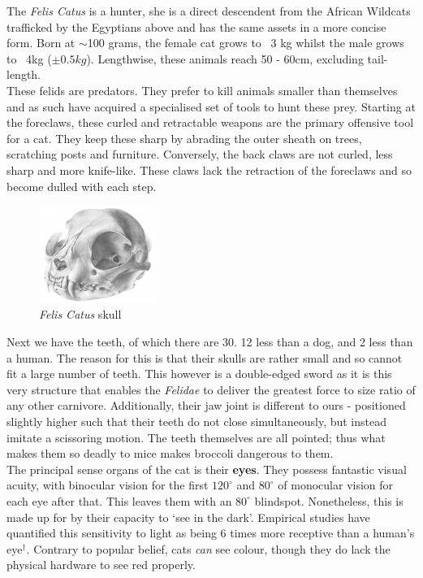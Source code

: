 \documentclass{article}
\begin{document}
\noindent{}The \emph{Felis Catus} is a hunter, she is a direct descendent from the African Wildcats trafficked by the Egyptians above and has the same assets in a more concise form. Born at $\sim$100 grams, the female cat grows to ~3 kg whilst the male grows to ~4kg (\(\pm0.5kg\)). Lengthwise, these animals reach 50 - 60cm, excluding tail-length.\\

These \gls{felid}s are predators. They prefer to kill animals smaller than themselves and as such have acquired a specialised set of tools to hunt these prey. Starting at the foreclaws, these curled and retractable weapons are the primary offensive tool for a cat. They keep these sharp by abrading the outer sheath on trees, scratching posts and furniture. Conversely, the back claws are not curled, less sharp and more knife-like. These claws lack the retraction of the foreclaws and so become dulled with each step.\\

\begin{figure}
    \includegraphics[width=0.35\textwidth]{img/cat-skull.png}
    \caption{\emph{Felis Catus} skull}
\end{figure}
Next we have the teeth, of which there are 30. 12 less than a dog, and 2 less than a human. The reason for this is that their skulls are rather small and so cannot fit a large number of teeth. This however is a double-edged sword as it is this very structure that enables the \emph{Felidae} to deliver the greatest force to size ratio of any other carnivore. Additionally, their jaw joint is different to ours - positioned slightly higher such that their teeth do not close simultaneously, but instead imitate a scissoring motion. The teeth themselves are all pointed; thus what makes them so deadly to mice makes broccoli dangerous to them.\\

The principal sense organs of the cat is their \textbf{eyes}. They possess fantastic visual acuity, with binocular vision for the first \(120^\circ\) and \(80^\circ\) of monocular vision for each eye after that. This leaves them with an \(80^\circ\) blindspot. Nonetheless, this is made up for by their capacity to `see in the dark'. Empirical studies have quantified this sensitivity to light as being 6 times more receptive than a human's eye\(^\dagger\). Contrary to popular belief, cats \emph{can} see colour, though they do lack the physical hardware to see red properly.\\
\end{document}
